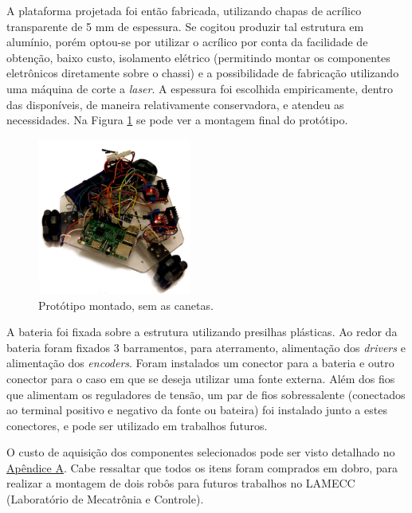 A plataforma projetada foi então fabricada, utilizando chapas de acrílico transparente de 5 mm de espessura. Se cogitou produzir tal estrutura em alumínio, porém optou-se por utilizar o acrílico por conta da facilidade de obtenção, baixo custo, isolamento elétrico (permitindo montar os componentes eletrônicos diretamente sobre o chassi) e a possibilidade de fabricação utilizando uma máquina de corte a \textit{laser}. A espessura foi escolhida empiricamente, dentro das disponíveis, de maneira relativamente conservadora, e atendeu as necessidades. Na Figura \ref{fig:montagem} se pode ver a montagem final do protótipo.

\begin{figure}[h]
  \centering
  \includegraphics[width = 0.45\textwidth]{imagens/roboto}
  \caption{Protótipo montado, sem as canetas.}
  \label{fig:montagem}
\end{figure}

A bateria foi fixada sobre a estrutura utilizando presilhas plásticas. Ao redor da bateria foram fixados 3 barramentos, para aterramento, alimentação dos \textit{drivers} e alimentação dos \textit{encoders}. Foram instalados um conector para a bateria e outro conector para o caso em que se deseja utilizar uma fonte externa.  Além dos fios que alimentam os reguladores de tensão, um par de fios sobressalente (conectados ao terminal positivo e negativo da fonte ou bateira) foi instalado junto a estes conectores, e pode ser utilizado em trabalhos futuros.

O custo de aquisição dos componentes selecionados pode ser visto detalhado no \hyperref[sec:custo]{Apêndice A}. Cabe ressaltar que todos os itens foram comprados em dobro, para realizar a montagem de dois robôs para futuros trabalhos no LAMECC (Laboratório de Mecatrônia e Controle).%

